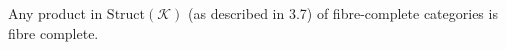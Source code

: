 Any product in $\text{Struct}(\mathcal{K})$ (as described in 3.7) of fibre-complete categories is fibre complete.
